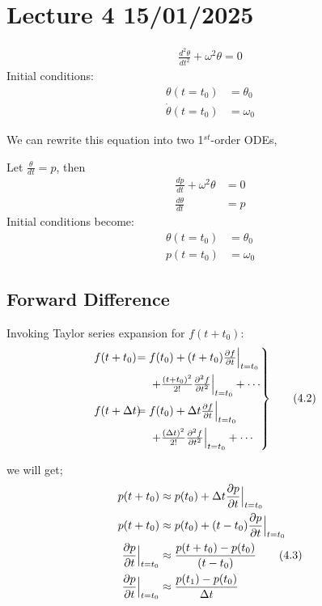 \documentclass[fleqn,10pt]{SelfArx} %
\begin{document}
\clearpage
\section{Lecture 4 15/01/2025}
\begin{align*}
	\frac{d^2 \theta}{dt^2} + \omega^2\theta = 0 \tag{4.1} \label{simplependulum0}
\end{align*}
Initial conditions:
\begin{align*}
	\theta(t=t_0)       & =\theta_0 \\
	\dot{\theta}(t=t_0) & =\omega_0
\end{align*}

We can rewrite this equation into two 1$^{st}$-order ODEs,

Let $\frac{\theta}{dt}=p$, then
\begin{align}
	\frac{dp}{dt} + \omega^2\theta & = 0 \tag{4.i}  \label{eq:ic1} \\
	\frac{d\theta}{dt}             & = p \tag{4.ii} \label{eq:ic2}
\end{align}
Initial conditions become:
\begin{align*}
	\theta(t=t_0) & =\theta_0 \\
	p(t=t_0)      & =\omega_0
\end{align*}

\subsection{Forward Difference}
Invoking Taylor series expansion for $f(t+t_0)$:
\begin{align*}
	\begin{rcases}
		f(t+t_0)      & \!\!\!\!\!\!\!\! = f(t_0) + (t+t_0)\frac{\partial f}{\partial t}\Big{|}_{t=t_0}                             \\
		              &+ \frac{(t+t_0)^2}{2!} \frac{\partial^2 f}{\partial t^2}\Big{|}_{t=t_0}	+ \cdots     \\
		f(t+\Delta t) & \!\!\!\!\!\!\!\! = f(t_0) + \Delta t \frac{\partial f}{\partial t}\Big{|}_{t=t_0}                           \\
		              &+ \frac{(\Delta t)^2}{2!} \frac{\partial^2 f}{\partial t^2}\Big{|}_{t=t_0} + \cdots
	\end{rcases} & \tag{4.2} \label{eq:taylor-exp-1}
\end{align*}

we will get;
\begin{align*}
	p(t+t_0)                                     & \approx p(t_0) + \Delta t \frac{\partial p}{\partial t}\Big{|}_{t=t_0}       \\
	p(t+t_0)                                     & \approx p(t_0) + (t-t_0) \frac{\partial p}{\partial t}\Big{|}_{t=t_0}        \\
	\frac{\partial p}{\partial t}\Big{|}_{t=t_0} & \approx \frac{p(t+t_0) - p(t_0)}{(t-t_0)} \tag{4.3} \label{eq:forwarddiff-p} \\
	\frac{\partial p}{\partial t}\Big{|}_{t=t_0} & \approx \frac{p(t_1) - p(t_0)}{\Delta t}
\end{align*}
\end{document}
